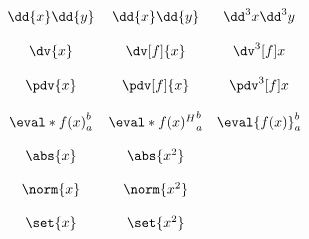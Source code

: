 \documentclass{standalone}
\begin{document}
\(\begin{array}{ccccc}
\\\\%
	\dd{x}\dd{y} & \dd{x}\dd{y} &\dd^3{x}\dd^3{y}
\\\\%
	\dv{x} & \dv[f]{x} &\dv^3[f]{x}
\\\\%
	\pdv{x} & \pdv[f]{x} & \pdv^3[f]{x}
\\\\%
	\eval*{f(x)}_a^b & \eval*{f(x)^H}_a^b & \eval{f(x)}_a^b
\\\\%
	\abs{x} & \abs{x^2} &
\\\\%
	\norm{x} & \norm{x^2} &
\\\\%
	\set{x} & \set{x^2} &
\\\\%
\end{array}\)
\end{document}
